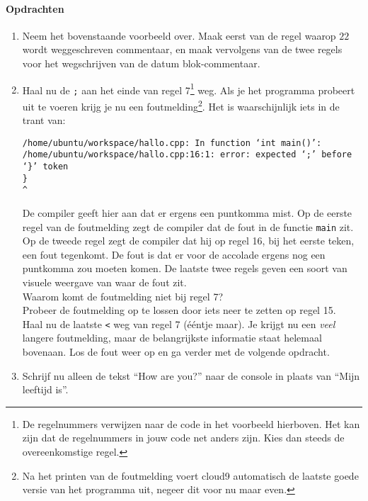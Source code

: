 \documentclass[12pt,a4paper]{article}
\begin{document}
\paragraph{Opdrachten}
\begin{enumerate}
		\item
			Neem het bovenstaande voorbeeld over. Maak eerst van de regel waarop $22$ wordt weggeschreven commentaar, en maak vervolgens van de twee regels voor het wegschrijven van de datum blok-commentaar.
		\item
			Haal nu de \texttt{;} aan het einde van regel 7\footnote{De regelnummers verwijzen naar de code in het voorbeeld hierboven. Het kan zijn dat de regelnummers in jouw code net anders zijn. Kies dan steeds de overeenkomstige regel.} weg. Als je het programma probeert uit te voeren krijg je nu een foutmelding\footnote{Na het printen van de foutmelding voert cloud9 automatisch de laatste goede versie van het programma uit, negeer dit voor nu maar even.}. Het is waarschijnlijk iets in de trant van:
			\begin{verbatim}
/home/ubuntu/workspace/hallo.cpp: In function ‘int main()’:                                                                                                      
/home/ubuntu/workspace/hallo.cpp:16:1: error: expected ‘;’ before ‘}’ token                                                                                      
}                                                                                                                                                               
^
			\end{verbatim}
			De compiler geeft hier aan dat er ergens een puntkomma mist. Op de eerste regel van de foutmelding zegt de compiler dat de fout in de functie \texttt{main} zit. Op de tweede regel zegt de compiler dat hij op regel 16, bij het eerste teken, een fout tegenkomt. De fout is dat er voor de accolade ergens nog een puntkomma zou moeten komen. De laatste twee regels geven een soort van visuele weergave van waar de fout zit. \\
			Waarom komt de foutmelding niet bij regel 7? \\
			Probeer de foutmelding op te lossen door iets neer te zetten op regel 15. \\
			Haal nu de laatste \texttt{<} weg van regel 7 (ééntje maar). Je krijgt nu een \emph{veel} langere foutmelding, maar de belangrijkste informatie staat helemaal bovenaan. Los de fout weer op en ga verder met de volgende opdracht.
		\item
			Schrijf nu alleen de tekst ``How are you?'' naar de console in plaats van ``Mijn leeftijd is''.

\end{enumerate}
\end{document}
